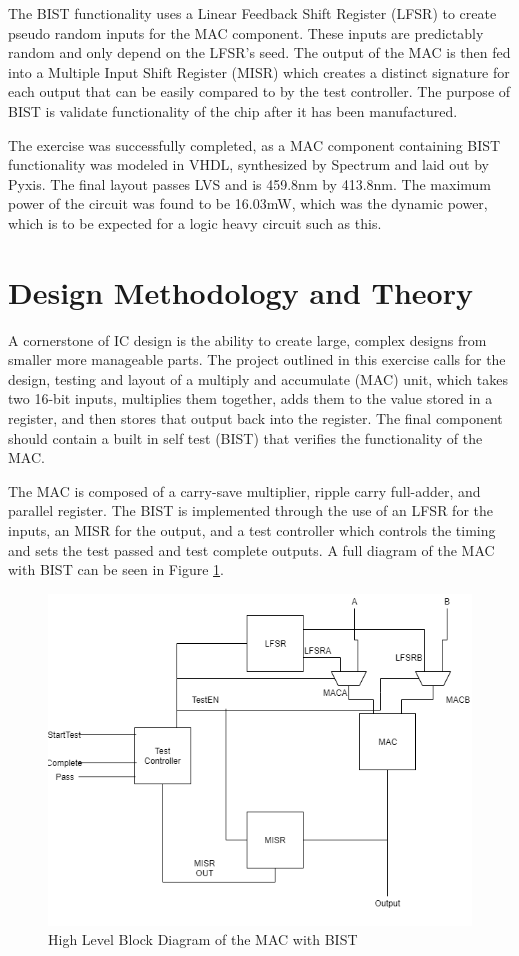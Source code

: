 \documentclass[11pt]{article}
\begin{document}
The BIST functionality uses a Linear Feedback Shift Register (LFSR) to create pseudo random inputs for the MAC component. These inputs are predictably random and only depend on the LFSR's seed. The output of the MAC is then fed into a Multiple Input Shift Register (MISR) which creates a distinct signature for each output that can be easily compared to by the test controller. The purpose of BIST is validate functionality of the chip after it has been manufactured.

The exercise was successfully completed, as a MAC component containing BIST functionality was modeled in VHDL, synthesized by Spectrum and laid out by Pyxis. The final layout passes LVS and is 459.8nm by 413.8nm. The maximum power of the circuit was found to be 16.03mW, which was the dynamic power, which is to be expected for a logic heavy circuit such as this.
	

\section{Design Methodology and Theory}

	A cornerstone of IC design is the ability to create large, complex designs from smaller more manageable parts. The project outlined in this exercise calls for the design, testing and layout of a multiply and accumulate (MAC) unit, which takes two 16-bit inputs, multiplies them together, adds them to the value stored in a register, and then stores that output back into the register. The final component should contain a built in self test (BIST) that verifies the functionality of the MAC.
	
	The MAC is composed of a carry-save multiplier, ripple carry full-adder, and parallel register. The BIST is implemented through the use of an LFSR for the inputs, an MISR for the output, and a test controller which controls the timing and sets the test passed and test complete outputs. A full diagram of the MAC with BIST can be seen in Figure \ref{fig:full-project-block}.
	
	\begin{figure}[H]
		\centering
		\includegraphics[width=0.7\linewidth]{Pictures/Full-Project-Block}
		\caption{High Level Block Diagram of the MAC with BIST}
		\label{fig:full-project-block}
	\end{figure}
\end{document}
